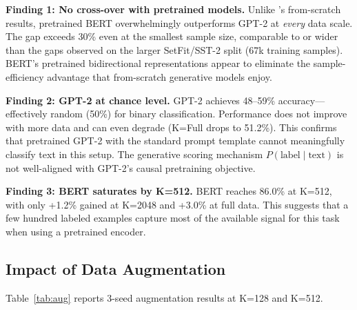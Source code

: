\documentclass[11pt,a4paper,twocolumn]{article}
\begin{document}
\textbf{Finding 1: No cross-over with pretrained models.} Unlike \cite{kasa2025}'s from-scratch results, pretrained BERT overwhelmingly outperforms GPT-2 at \textit{every} data scale. The gap exceeds 30\% even at the smallest sample size, comparable to or wider than the gaps observed on the larger SetFit/SST-2 split (67k training samples). BERT's pretrained bidirectional representations appear to eliminate the sample-efficiency advantage that from-scratch generative models enjoy.

\textbf{Finding 2: GPT-2 at chance level.} GPT-2 achieves 48--59\% accuracy---effectively random (50\%) for binary classification. Performance does not improve with more data and can even degrade (K=Full drops to 51.2\%). This confirms that pretrained GPT-2 with the standard prompt template cannot meaningfully classify text in this setup. The generative scoring mechanism $P(\text{label} \mid \text{text})$ is not well-aligned with GPT-2's causal pretraining objective.

\textbf{Finding 3: BERT saturates by K=512.} BERT reaches 86.0\% at K=512, with only +1.2\% gained at K=2048 and +3.0\% at full data. This suggests that a few hundred labeled examples capture most of the available signal for this task when using a pretrained encoder.

\subsection{Impact of Data Augmentation}

Table~\ref{tab:aug} reports 3-seed augmentation results at K=128 and K=512.

\begin{table}[H]
\centering
\small
{}
\caption{Augmentation results (3 seeds, mean $\pm$ std). Augmentation modestly helps GPT-2 at both scales (+1--4\%) and reduces classification variance. For BERT, augmentation provides marginal or even negative effects, particularly back-translation at K=512.}
\label{tab:aug}
\end{table}
\end{document}
